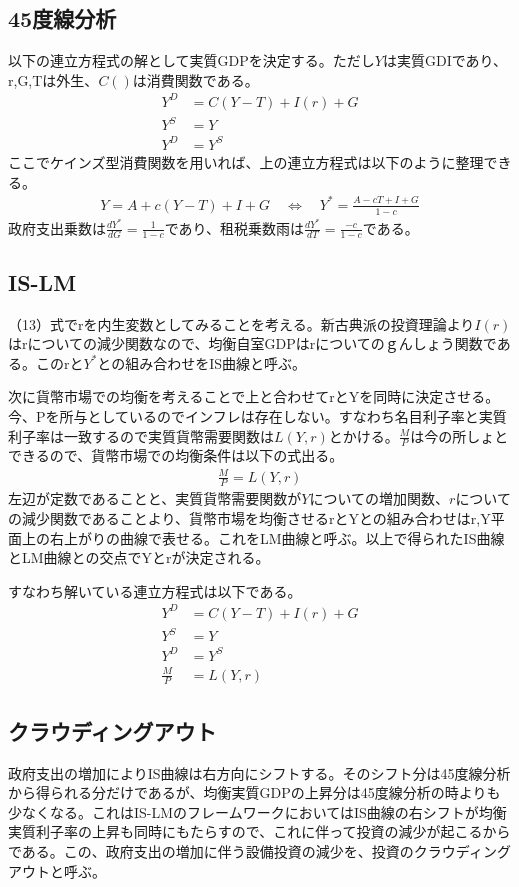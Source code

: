 \documentclass{jsarticle}
\begin{document}
\subsection{45度線分析}
以下の連立方程式の解として実質GDPを決定する。ただし$Y$は実質GDIであり、r,G,Tは外生、$C( )$は消費関数である。
\begin{align*}
	Y^D &= C(Y - T) + I(r) + G \\
	Y^S &= Y\\
	Y^D &= Y^S
\end{align*}
ここでケインズ型消費関数を用いれば、上の連立方程式は以下のように整理できる。
\begin{align}
	Y = A + c(Y - T) + I + G \quad \Leftrightarrow\quad Y^* = \frac{A - cT + I + G}{1 -c}
\end{align}
政府支出乗数は$\frac{d Y^*}{dG} = \frac{1}{1 -c}$であり、租税乗数雨は$\frac{dY^*}{dT} = \frac{-c}{1-c}$である。

\subsection{IS-LM}
（13）式でrを内生変数としてみることを考える。新古典派の投資理論より$I(r)$はrについての減少関数なので、均衡自室GDPはrについてのｇんしょう関数である。このrと$Y^*$との組み合わせをIS曲線と呼ぶ。

次に貨幣市場での均衡を考えることで上と合わせてrとYを同時に決定させる。今、Pを所与としているのでインフレは存在しない。すなわち名目利子率と実質利子率は一致するので実質貨幣需要関数は$L(Y, r)$とかける。$\frac{M}{P}$は今の所しょとできるので、貨幣市場での均衡条件は以下の式出る。
\begin{align}
	\frac{M}{P} = L(Y, r)
\end{align}
左辺が定数であることと、実質貨幣需要関数が$Y$についての増加関数、$r$についての減少関数であることより、貨幣市場を均衡させるrとYとの組み合わせはr,Y平面上の右上がりの曲線で表せる。これをLM曲線と呼ぶ。以上で得られたIS曲線とLM曲線との交点でYとrが決定される。

すなわち解いている連立方程式は以下である。
\begin{align*}
	Y^D &= C(Y - T) + I(r) + G \\
	Y^S &= Y\\
	Y^D &= Y^S\\
	\frac{M}{P} &= L(Y, r)
\end{align*}

\subsection{クラウディングアウト}
政府支出の増加によりIS曲線は右方向にシフトする。そのシフト分は45度線分析から得られる分だけであるが、均衡実質GDPの上昇分は45度線分析の時よりも少なくなる。これはIS-LMのフレームワークにおいてはIS曲線の右シフトが均衡実質利子率の上昇も同時にもたらすので、これに伴って投資の減少が起こるからである。この、政府支出の増加に伴う設備投資の減少を、投資のクラウディングアウトと呼ぶ。
\end{document}
